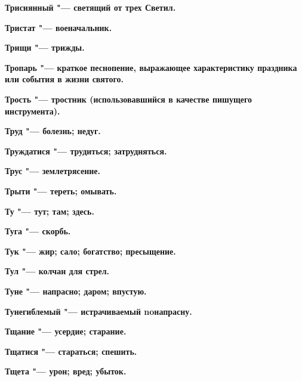 \begin{multicols}{2}
\bfseries Трисиянный\normalfont{} "--- светящий от трех Светил. 




\bfseries Тристат\normalfont{} "--- военачальник. 




\bfseries Трищи\normalfont{} "--- трижды. 




\bfseries Тропарь\normalfont{} "--- краткое песнопение, выражающее характеристику праздника или события в жизни святого. 




\bfseries Трость\normalfont{} "--- тростник (использовавшийся в качестве пишущего инструмента). 




\bfseries Труд\normalfont{} "--- болезнь; недуг. 




\bfseries Труждатися\normalfont{} "--- трудиться; затрудняться. 




\bfseries Трус\normalfont{} "--- землетрясение. 




\bfseries Трыти\normalfont{} "--- тереть; омывать. 




\bfseries Ту\normalfont{} "--- тут; там; здесь. 




\bfseries Туга\normalfont{} "--- скорбь. 




\bfseries Тук\normalfont{} "--- жир; сало; богатство; пресыщение. 




\bfseries Тул\normalfont{} "--- колчан для стрел. 




\bfseries Туне\normalfont{} "--- напрасно; даром; впустую. 




\bfseries Тунегиблемый\normalfont{} "--- истрачиваемый noнапрасну. 




\bfseries Тщание\normalfont{} "--- усердие; старание. 




\bfseries Тщатися\normalfont{} "--- стараться; спешить. 




\bfseries Тщета\normalfont{} "--- урон; вред; убыток. 





\end{multicols}
